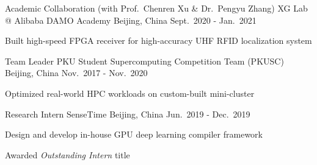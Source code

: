 \begin{cventries}
  \cventry
    {Academic Collaboration (with Prof.\ Chenren Xu \& Dr.\ Pengyu Zhang)} %
    {XG Lab @ Alibaba DAMO Academy} %
    {Beijing, China} %
    {Sept.\ 2020 - Jan.\ 2021} %
    {
      \begin{cvitems} %
        \item {Built high-speed FPGA receiver for high-accuracy UHF RFID localization system}
      \end{cvitems}
    }

  \cventry
    {Team Leader} %
    {PKU Student Supercomputing Competition Team (PKUSC)} %
    {Beijing, China} %
    {Nov.\ 2017 - Nov.\ 2020} %
    {
      \begin{cvitems} %
        \item {Optimized real-world HPC workloads on custom-built mini-cluster}
      \end{cvitems}
    }

\end{cventries}


\begin{cventries}
    \cventry
    {Research Intern}
    {SenseTime}
    {Beijing, China}
    {Jun.\ 2019 - Dec.\ 2019}
    {
        \begin{cvitems}
        \item {Design and develop in-house GPU deep learning compiler framework}
        \item {Awarded \textit{Outstanding Intern} title}
        \end{cvitems}
    }
\end{cventries}


